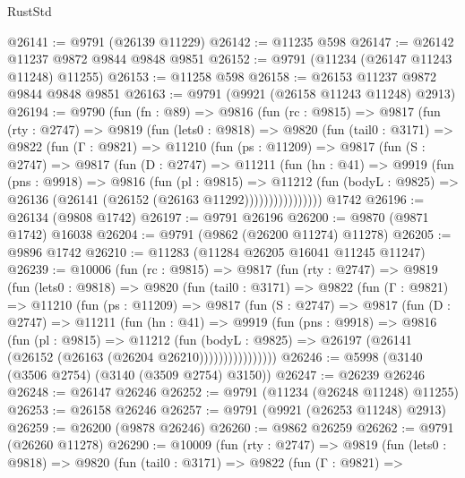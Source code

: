 \begin{lexlean}{RustStd}
\begin{coremodule}
@26141 := @9791 (@26139 @11229)
@26142 := @11235 @598
@26147 := @26142 @11237 @9872 @9844 @9848 @9851
@26152 := @9791 (@11234 (@26147 @11243 @11248) @11255)
@26153 := @11258 @598
@26158 := @26153 @11237 @9872 @9844 @9848 @9851
@26163 := @9791 (@9921 (@26158 @11243 @11248) @2913)
@26194 := @9790
    (fun (fn : @89) =>
    @9816
      (fun (rc : @9815) =>
      @9817
        (fun (rty : @2747) =>
        @9819
          (fun (lets0 : @9818) =>
          @9820
            (fun (tail0 : @3171) =>
            @9822
              (fun (Γ : @9821) =>
              @11210
                (fun (ps : @11209) =>
                @9817
                  (fun (S : @2747) =>
                  @9817
                    (fun (D : @2747) =>
                    @11211
                      (fun (hn : @41) =>
                      @9919
                        (fun (pns : @9918) =>
                        @9816
                          (fun (pl : @9815) =>
                          @11212
                            (fun (bodyL : @9825) =>
                            @26136 (@26141 (@26152 (@26163 @11292))))))))))))))))
    @1742
@26196 := @26134 (@9808 @1742)
@26197 := @9791 @26196
@26200 := @9870 (@9871 @1742) @16038
@26204 := @9791 (@9862 (@26200 @11274) @11278)
@26205 := @9896 @1742
@26210 := @11283 (@11284 @26205 @16041 @11245 @11247)
@26239 := @10006
    (fun (rc : @9815) =>
    @9817
      (fun (rty : @2747) =>
      @9819
        (fun (lets0 : @9818) =>
        @9820
          (fun (tail0 : @3171) =>
          @9822
            (fun (Γ : @9821) =>
            @11210
              (fun (ps : @11209) =>
              @9817
                (fun (S : @2747) =>
                @9817
                  (fun (D : @2747) =>
                  @11211
                    (fun (hn : @41) =>
                    @9919
                      (fun (pns : @9918) =>
                      @9816
                        (fun (pl : @9815) =>
                        @11212
                          (fun (bodyL : @9825) =>
                          @26197 (@26141 (@26152 (@26163 (@26204 @26210))))))))))))))))
@26246 := @5998 (@3140 (@3506 @2754) (@3140 (@3509 @2754) @3150))
@26247 := @26239 @26246
@26248 := @26147 @26246
@26252 := @9791 (@11234 (@26248 @11248) @11255)
@26253 := @26158 @26246
@26257 := @9791 (@9921 (@26253 @11248) @2913)
@26259 := @26200 (@9878 @26246)
@26260 := @9862 @26259
@26262 := @9791 (@26260 @11278)
@26290 := @10009
    (fun (rty : @2747) =>
    @9819
      (fun (lets0 : @9818) =>
      @9820
        (fun (tail0 : @3171) =>
        @9822
          (fun (Γ : @9821) =>

\end{coremodule}
\end{lexlean}
